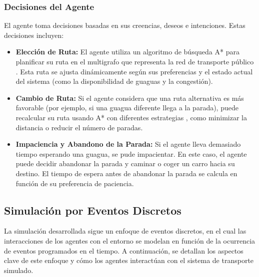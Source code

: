 \documentclass[a4paper,12pt]{article}
\begin{document}
\subsubsection{Decisiones del Agente}

El agente toma decisiones basadas en sus creencias, deseos e intenciones. Estas decisiones incluyen:

\begin{itemize}
    \item \textbf{Elección de Ruta:} El agente utiliza un algoritmo de búsqueda A* para planificar su ruta en el multigrafo que representa la red de transporte público \cite{hart1968formal}. Esta ruta se ajusta dinámicamente según sus preferencias y el estado actual del sistema (como la disponibilidad de guaguas y la congestión).
    
    \item \textbf{Cambio de Ruta:} Si el agente considera que una ruta alternativa es más favorable (por ejemplo, si una guagua diferente llega a la parada), puede recalcular su ruta usando A* con diferentes estrategias \cite{hart1968formal}, como minimizar la distancia o reducir el número de paradas.

    \item \textbf{Impaciencia y Abandono de la Parada:} Si el agente lleva demasiado tiempo esperando una guagua, se pude impacientar. En este caso, el agente puede decidir abandonar la parada y caminar o coger un carro hacia su destino. El tiempo de espera antes de abandonar la parada se calcula en función de su preferencia de paciencia.
\end{itemize}
\subsection{Simulación por Eventos Discretos}
La simulación desarrollada sigue un enfoque de eventos discretos, en el cual las interacciones de los agentes con el entorno se modelan en función de la ocurrencia de eventos programados en el tiempo. A continuación, se detallan los aspectos clave de este enfoque y cómo los agentes interactúan con el sistema de transporte simulado.
\end{document}
